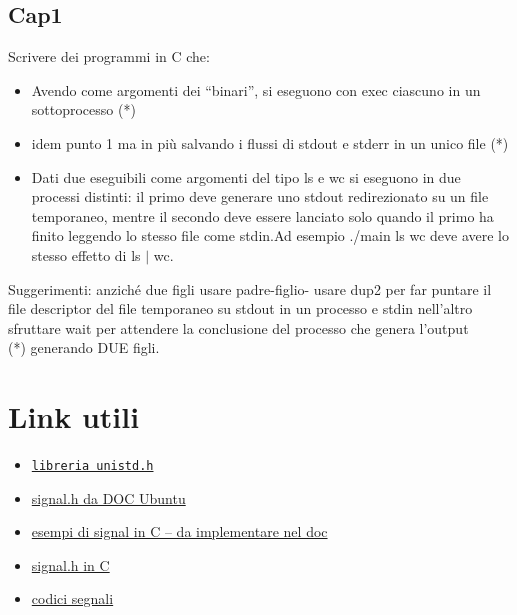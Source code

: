 \documentclass[a4paper]{article}
\begin{document}
\subsection{Cap1}
Scrivere dei programmi in C che:
\begin{itemize}
    \item Avendo come argomenti dei “binari”, si eseguono con exec ciascuno in un sottoprocesso (*)
    \item idem punto 1 ma in più salvando i flussi di stdout e stderr in un unico file (*)
    \item Dati due eseguibili come argomenti del tipo ls e wc si eseguono in due processi distinti: il primo deve generare uno stdout redirezionato su un file temporaneo, mentre il secondo deve essere lanciato solo quando il primo ha finito leggendo lo stesso file come stdin.Ad esempio ./main ls wc deve avere lo stesso effetto di ls $|$ wc.
\end{itemize}

Suggerimenti: anziché due figli usare padre-figlio- usare dup2 per far puntare il file descriptor del file temporaneo su stdout in un processo e stdin nell'altro sfruttare wait per attendere la conclusione del processo che genera l’output\\(*) generando DUE figli.

\clearpage
\section{Link utili}
\begin{itemize}
  \item \tt{\href{https://digilander.libero.it/uzappi/C/librerie/C-unistd.html}{libreria unistd.h}}
  \item \href{http://manpages.ubuntu.com/manpages/trusty/man7/signal.h.7posix.html}{signal.h da DOC Ubuntu}
  \item \href{https://www.geeksforgeeks.org/signals-c-language/}{esempi di signal in C -- da implementare nel doc}
  \item \href{https://www.tutorialspoint.com/c_standard_library/c_function_signal.htm}{signal.h in C}
  \item \href{https://www.computerhope.com/unix/signals.htm}{codici segnali }
\end{itemize}
\end{document}
